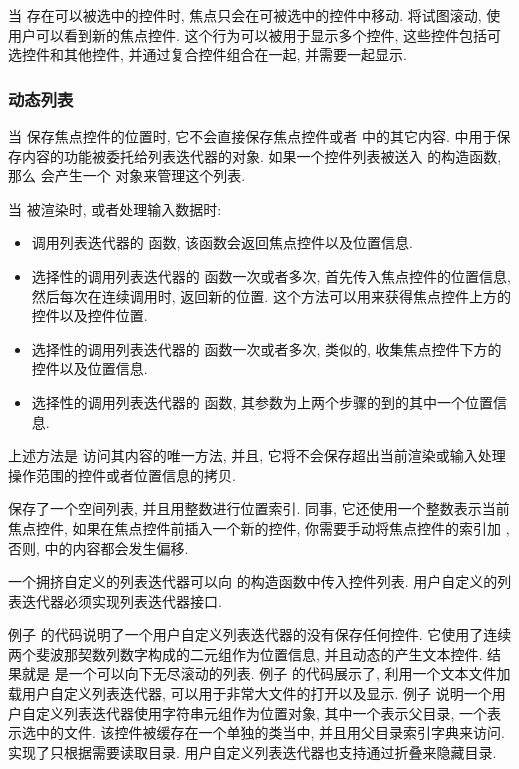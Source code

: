当  存在可以被选中的控件时, 焦点只会在可被选中的控件中移动.  将试图滚动, 使用户可以看到新的焦点控件. 这个行为可以被用于显示多个控件, 这些控件包括可选控件和其他控件, 并通过复合控件组合在一起, 并需要一起显示.

\subsubsection{动态列表}
当  保存焦点控件的位置时, 它不会直接保存焦点控件或者  中的其它内容.  中用于保存内容的功能被委托给列表迭代器的对象. 如果一个控件列表被送入  的构造函数, 那么  会产生一个  对象来管理这个列表.

当  被渲染时, 或者处理输入数据时:%
%
\begin{itemize}
  \item 调用列表迭代器的  函数, 该函数会返回焦点控件以及位置信息.
  \item 选择性的调用列表迭代器的  函数一次或者多次, 首先传入焦点控件的位置信息, 然后每次在连续调用时, 返回新的位置. 这个方法可以用来获得焦点控件上方的控件以及控件位置.
  \item 选择性的调用列表迭代器的  函数一次或者多次, 类似的, 收集焦点控件下方的控件以及位置信息.
  \item 选择性的调用列表迭代器的  函数, 其参数为上两个步骤的到的其中一个位置信息.
\end{itemize}%
%
上述方法是  访问其内容的唯一方法, 并且, 它将不会保存超出当前渲染或输入处理操作范围的控件或者位置信息的拷贝.

\indent{} 保存了一个空间列表, 并且用整数进行位置索引. 同事, 它还使用一个整数表示当前焦点控件, 如果在焦点控件前插入一个新的控件, 你需要手动将焦点控件的索引加 , 否则,  中的内容都会发生偏移.

一个拥挤自定义的列表迭代器可以向  的构造函数中传入控件列表. 用户自定义的列表迭代器必须实现列表迭代器接口.

例子  的代码说明了一个用户自定义列表迭代器的没有保存任何控件. 它使用了连续两个斐波那契数列数字构成的二元组作为位置信息, 并且动态的产生文本控件. 结果就是  是一个可以向下无尽滚动的列表. 例子  的代码展示了, 利用一个文本文件加载用户自定义列表迭代器, 可以用于非常大文件的打开以及显示. 例子  说明一个用户自定义列表迭代器使用字符串元组作为位置对象, 其中一个表示父目录, 一个表示选中的文件. 该控件被缓存在一个单独的类当中, 并且用父目录索引字典来访问. 实现了只根据需要读取目录. 用户自定义列表迭代器也支持通过折叠来隐藏目录.

